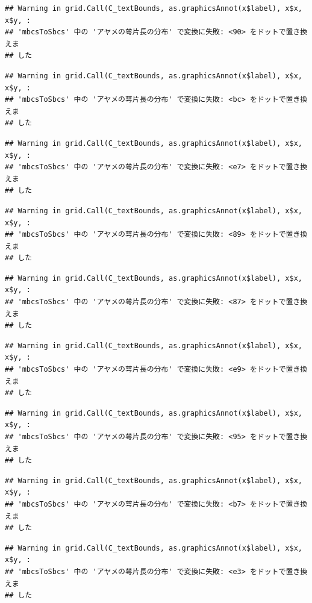 \documentclass[
]{book}
\begin{document}
\begin{verbatim}
## Warning in grid.Call(C_textBounds, as.graphicsAnnot(x$label), x$x, x$y, :
## 'mbcsToSbcs' 中の 'アヤメの萼片長の分布' で変換に失敗: <90> をドットで置き換えま
## した
\end{verbatim}

\begin{verbatim}
## Warning in grid.Call(C_textBounds, as.graphicsAnnot(x$label), x$x, x$y, :
## 'mbcsToSbcs' 中の 'アヤメの萼片長の分布' で変換に失敗: <bc> をドットで置き換えま
## した
\end{verbatim}

\begin{verbatim}
## Warning in grid.Call(C_textBounds, as.graphicsAnnot(x$label), x$x, x$y, :
## 'mbcsToSbcs' 中の 'アヤメの萼片長の分布' で変換に失敗: <e7> をドットで置き換えま
## した
\end{verbatim}

\begin{verbatim}
## Warning in grid.Call(C_textBounds, as.graphicsAnnot(x$label), x$x, x$y, :
## 'mbcsToSbcs' 中の 'アヤメの萼片長の分布' で変換に失敗: <89> をドットで置き換えま
## した
\end{verbatim}

\begin{verbatim}
## Warning in grid.Call(C_textBounds, as.graphicsAnnot(x$label), x$x, x$y, :
## 'mbcsToSbcs' 中の 'アヤメの萼片長の分布' で変換に失敗: <87> をドットで置き換えま
## した
\end{verbatim}

\begin{verbatim}
## Warning in grid.Call(C_textBounds, as.graphicsAnnot(x$label), x$x, x$y, :
## 'mbcsToSbcs' 中の 'アヤメの萼片長の分布' で変換に失敗: <e9> をドットで置き換えま
## した
\end{verbatim}

\begin{verbatim}
## Warning in grid.Call(C_textBounds, as.graphicsAnnot(x$label), x$x, x$y, :
## 'mbcsToSbcs' 中の 'アヤメの萼片長の分布' で変換に失敗: <95> をドットで置き換えま
## した
\end{verbatim}

\begin{verbatim}
## Warning in grid.Call(C_textBounds, as.graphicsAnnot(x$label), x$x, x$y, :
## 'mbcsToSbcs' 中の 'アヤメの萼片長の分布' で変換に失敗: <b7> をドットで置き換えま
## した
\end{verbatim}

\begin{verbatim}
## Warning in grid.Call(C_textBounds, as.graphicsAnnot(x$label), x$x, x$y, :
## 'mbcsToSbcs' 中の 'アヤメの萼片長の分布' で変換に失敗: <e3> をドットで置き換えま
## した
\end{verbatim}
\end{document}
